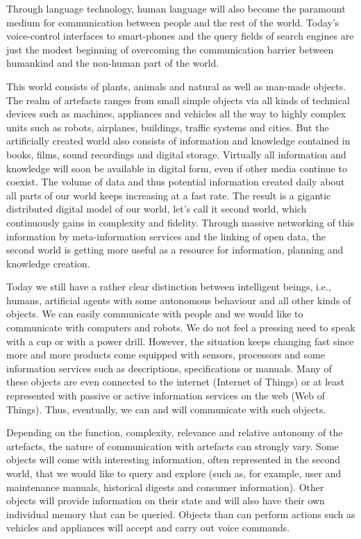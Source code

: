 \begin{multicols}{2}
Through language technology, human language will also become the paramount medium for communication between people and the rest of the world. Today’s voice-control interfaces to smart-phones and the query fields of search engines are just the modest beginning of overcoming the communication barrier between humankind and the non-human part of the world.
 
This world consists of plants, animals and natural as well as man-made objects. The realm of artefacts ranges from small simple objects via all kinds of technical devices such as machines, appliances and vehicles all the way to highly complex units such as robots, airplanes, buildings, traffic systems and cities. But the artificially created world also consists of information and knowledge contained in books, films, sound recordings and digital storage. Virtually all information and knowledge will soon be available in digital form, even if other media continue to coexist. The volume of data and thus potential information created daily about all parts of our world keeps increasing at a fast rate. The result is a gigantic distributed digital model of our world, let’s call it second world, which continuously gains in complexity and fidelity. Through massive networking of this information by meta-information services and the linking of open data, the second world is getting more useful as a resource for information, planning and knowledge creation. 
 
Today we still have a rather clear distinction between intelligent beings, i.e., humans, artificial agents with some autonomous behaviour and all other kinds of objects. We can easily communicate with people and we would like to communicate with computers and robots. We do not feel a pressing need to speak with a cup or with a power drill. However, the situation keeps changing fast since more and more products come equipped with sensors, processors and some information services such as descriptions, specifications or manuals. Many of these objects are even connected to the internet (Internet of Things) or at least represented with passive or active information services on the web (Web of Things). Thus, eventually, we can and will communicate with such objects.
 
Depending on the function, complexity, relevance and relative autonomy of the artefacts, the nature of communication with artefacts can strongly vary. Some objects will come with interesting information, often represented in the second world, that we would like to query and explore (such as, for example, user and maintenance manuals, historical digests and consumer information). Other objects will provide information on their state and will also have their own individual memory that can be queried. Objects than can perform actions such as vehicles and appliances will accept and carry out voice commands. 
 

\end{multicols}
